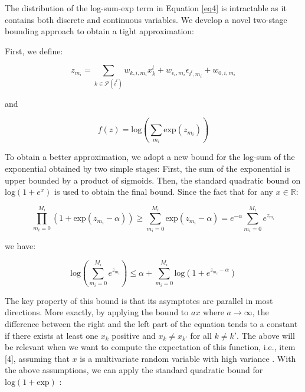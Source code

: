 \documentclass[review]{elsarticle}
\begin{document}
The distribution of the log-sum-exp term in Equation \ref{eq4} is intractable as it contains both discrete and continuous variables. We develop a novel two-stage bounding approach to obtain a tight approximation:

First, we define:

\begin{equation*}
    z_{m_{i}} = \sum_{k \in {\mathcal{P}(i^l)}}w_{k, i, m_{i}}x_{k}^l + w_{\epsilon_{i}, m_{i}}\epsilon_{i^l, m_{i}} + w_{0,i, m_{i}}
\end{equation*}

\noindent and 

\begin{equation*}
  f(z) = \text{log}(\sum_{m_{i}}\text{exp}(z_{m_{i}}))
\end{equation*}

To obtain a better approximation, we adopt a new bound for the log-sum of the exponential obtained by two simple stages: First, the sum of the exponential is upper bounded by a product of sigmoids. Then, the standard quadratic bound on $\text{log}(1+e^{x})$ is used to obtain the final bound. Since the fact that for any $x \in \mathbb{R}$:

  \[
    \prod_{m_{i} = 0}^{M_{i}}(1 + \text{exp}(z_{m_{i}} - \alpha))
    \geq \sum_{m_{i} = 0}^{M_{i}}\text{exp}(z_{m_{i}} - \alpha)
    = e^{- \alpha}\sum_{m_{i} = 0}^{M_{i}}e^{z_{m_{i}}}
    \]
    
\noindent we have:

\begin{equation} \label{eq5}
    \text{log}(\sum_{m_{i} = 0}^{M_{i}}e^{z_{m_{i}}})
    \leq \alpha + \sum_{m_{i} = 0}^{M_{i}}\text{log}(1 + e^{z_{m_{i}} - \alpha})    
\end{equation}



The key property of this bound is that its asymptotes are parallel in most directions. More exactly, by applying the bound to $ax$ where $a \rightarrow \infty$, the difference between the right and the left part of the equation tends to a constant if there exists at least one $x_{k}$ positive and $x_{k} \neq x_{k'}$ for all $k \neq k'$. The above will be relevant when we want to compute the expectation of this function, i.e., item [4], assuming that $\textit{x}$ is a multivariate random variable with high variance \cite{bouchard2008efficient}.
With the above assumptions, we can apply the standard quadratic bound for $\text{log}(1+\text{exp})$ \cite{jaakkola1997variational}:
\end{document}
